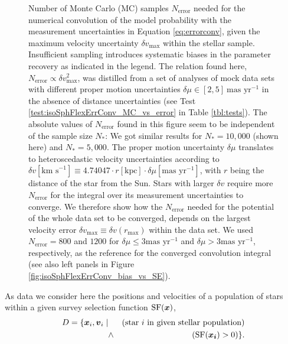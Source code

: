 \begin{figure}[!htbp]
\caption{Number of Monte Carlo (MC) samples $N_\text{error}$ needed for the numerical convolution of the model probability with the measurement uncertainties in Equation \ref{eq:errorconv}, given the maximum velocity uncertainty $\delta v_\text{max}$ within the stellar sample. Insufficient sampling introduces systematic biases in the parameter recovery as indicated in the legend. The relation found here, $N_\text{error} \propto \delta v_\text{max}^2$, was distilled from a set of analyses of mock data sets with different proper motion uncertainties $\delta \mu \in [2,5]~\text{mas yr}^{-1}$ in the absence of distance uncertainties (see Test \ref{test:isoSphFlexErrConv_MC_vs_error} in Table \ref{tbl:tests}). The absolute values of $N_\text{error}$ found in this figure seem to be independent of the sample size $N_{*}$: We got similar results for $N_{*}=10,000$ (shown here) and $N_{*}=5,000$. The proper motion uncertainty $\delta \mu$ translates to heteroscedastic  velocity uncertainties according to $\delta v [\text{km s}^{-1}] \equiv 4.74047 \cdot r[\text{kpc}] \cdot \delta \mu [\text{mas yr}^{-1}]$, with $r$ being the distance of the star from the Sun. Stars with larger $\delta v$ require more $N_\text{error}$ for the integral over its measurement uncertainties to converge. We therefore show how the $N_\text{error}$ needed for the potential \pdf{} of the whole data set to be converged, depends on the largest velocity error $\delta v_\text{max} \equiv \delta v(r_\text{max})$ within the data set. We used $N_\text{error} = 800$ and  $1200$ for $\delta \mu \leq 3 \text{mas yr}^{-1}$ and $\delta \mu > 3 \text{mas yr}^{-1}$, respectively, as the reference for the converged convolution integral (see also left panels in Figure \ref{fig:isoSphFlexErrConv_bias_vs_SE}).  }
\label{fig:isoSphFlexErrConv_MC_vs_error}
\end{figure}


As data we consider here the positions and velocities of a population of stars within a given survey selection function $\text{SF}(\boldsymbol{x})$,
\begin{eqnarray*}
D  =\{ \boldsymbol{x}_i,\boldsymbol{v}_i \mid && \text{(star $i$ in given stellar population)}\nonumber\\
&\wedge& (\text{SF}(\boldsymbol{x_i}) > 0) \}.
\end{eqnarray*}

